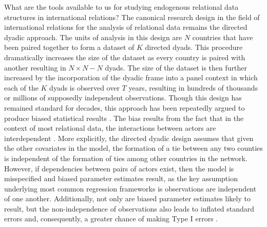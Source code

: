 \documentclass[3p,times,twocolumn,authoryear,12pt]{elsarticle}
\begin{document}
What are the tools available to us for studying endogenous relational data structures in international relations? The canonical research design in the field of international relations for the analysis of relational data remains the directed dyadic approach. The units of analysis in this design are $N$ countries that have been paired together to form a dataset of $K$ directed dyads. This procedure dramatically increases the size of the dataset as every country is paired with another resulting in $N \times N - N$ dyads. The size of the dataset is then further increased by the incorporation of the dyadic frame into a panel context in which each of the $K$ dyads is observed over $T$ years, resulting in hundreds of thousands or millions of supposedly independent observations. Though this design has remained standard for decades, this approach has been repeatedly argued to produce biased statistical results \citep{hoff:2005, snijders2011, cranmer:desmarais:etal:2012}. The bias results from the fact that in the context of most relational data, the interactions between actors are interdependent \citep{hoff:ward:2004, cranmer:desmarais:2011}. More explicitly, the directed dyadic design assumes that given the other covariates in the model, the formation of a tie between any two counties is independent of the formation of ties among other countries in the network. However, if dependencies between pairs of actors exist, then the model is misspecified and biased parameter estimates result, as the key assumption underlying most common regression frameworks is observations are independent of one another. Additionally, not only are biased parameter estimates likely to result, but the non-independence of observations also leads to inflated standard errors and, consequently, a greater chance of making Type I errors \citep{erikson:etal:2014}. 
\end{document}
